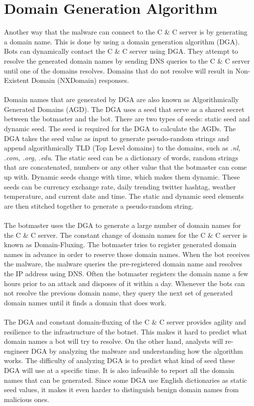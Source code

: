 \section{Domain Generation Algorithm}
Another way that the malware can connect to the C \& C server is by generating a domain name. This is done by using a domain generation algorithm (DGA). Bots can dynamically contact the C \& C server using DGA. They attempt to resolve the generated domain names by sending DNS queries to the C \& C server until one of the domains resolves. Domains that do not resolve will result in Non-Existent Domain (NXDomain) responses.\\\\
Domain names that are generated by DGA are also known as Algorithmically Generated Domains (AGD). The DGA uses a seed that serve as a shared secret between the botmaster and the bot. There are two types of seeds: static seed and dynamic seed. The seed is required for the DGA to calculate the AGDs. The DGA takes the seed value as input to generate pseudo-random strings and append algorithmically TLD (Top Level domains) to the domains, such as \textit{.nl, .com, .org, .edu}. The static seed can be a dictionary of words, random strings that are concatenated, numbers or any other value that the botmaster can come up with. Dynamic seeds change with time, which makes them dynamic. These seeds can be currency exchange rate, daily trending twitter hashtag, weather temperature, and current date and time. The static and dynamic seed elements are then stitched together to generate a pseudo-random string. \\\\
The botmaster uses the DGA to generate a large number of domain names for the C \& C server. The constant change of domain names for the C \& C server is known as Domain-Fluxing. The botmaster tries to register generated domain names in advance in order to reserve those domain names. When the bot receives the malware, the malware queries the pre-registered domain name and resolves the IP address using DNS. Often the botmaster registers the domain name a few hours prior to an attack and disposes of it within a day. Whenever the bots can not resolve the previous domain name, they query the next set of generated domain names until it finds a domain that does work. \\\\
The DGA and constant domain-fluxing of the C \& C server provides agility and resilience to the infrastructure of the botnet. This makes it hard to predict what domain names a bot will try to resolve. On the other hand, analysts will re-engineer DGA by analyzing the malware and understanding how the algorithm works. The difficulty of analyzing DGA is to predict what kind of seed these DGA will use at a specific time. It is also infeasible to report all the domain names that can be generated. Since some DGA use English dictionaries as static seed values, it makes it even harder to distinguish benign domain names from malicious ones. 

